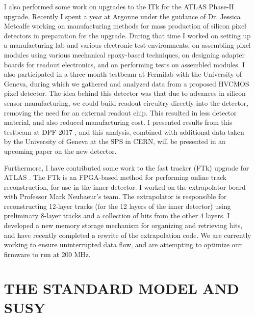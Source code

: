 \documentclass{article}
\begin{document}
I also performed some work on upgrades to the ITk for the ATLAS Phase-II upgrade. Recently I spent a year at Argonne under the guidance of Dr. Jessica Metcalfe working on manufacturing methods for mass production of silicon pixel detectors in preparation for the upgrade. During that time I worked on setting up a manufacturing lab and various electronic test environments, on assembling pixel modules using various mechanical epoxy-based techniques, on designing adapter boards for readout electronics, and on performing tests on assembled modules. I also participated in a three-month testbeam at Fermilab with the University of Geneva, during which we gathered and analyzed data from a proposed HVCMOS pixel detector. The idea behind this detector was that due to advances in silicon sensor manufacturing, we could build readout circuitry directly into the detector, removing the need for an external readout chip. This resulted in less detector material, and also reduced manufacturing cost. I presented results from this testbeam at DPF 2017 \cite{DPF}, and this analysis, combined with additional data taken by the University of Geneva at the SPS in CERN, will be presented in an upcoming paper on the new detector.

Furthermore, I have contributed some work to the fast tracker (FTk) upgrade for ATLAS \cite{FTk}. The FTk is an FPGA-based method for performing online track reconstruction, for use in the inner detector. I worked on the extrapolator board with Professor Mark Neubaeur's team. The extrapolator is responsible for reconstructing 12-layer tracks (for the 12 layers of the inner detector) using preliminary 8-layer tracks and a collection of hits from the other 4 layers. I developed a new memory storage mechanism for organizing and retrieving hits, and have recently completed a rewrite of the extrapolation code. We are currently working to ensure uninterrupted data flow, and are attempting to optimize our firmware to run at 200 MHz.


\section*{THE STANDARD MODEL AND SUSY}
\end{document}
